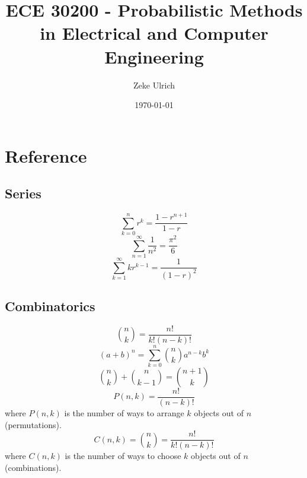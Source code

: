 \documentclass[nobib]{tufte-handout}
\title{ECE 30200 - Probabilistic Methods in Electrical and Computer Engineering}
\author{Zeke Ulrich}
\date{\today}  %
\begin{document}
\maketitle

\tableofcontents

\pagebreak








\appendix

\section{Reference}
\setcounter{equation}{0}


\subsection{Series}
\begin{equation}
    \sum_{k=0}^{n} r^k = \frac{1 - r^{n + 1}}{1 - r}
\end{equation}
\begin{equation}
    \sum_{n=1}^{\infty} \frac{1}{n^2} = \frac{\pi^2}{6}
\end{equation}
\begin{equation}
    \sum_{k=1}^{\infty}kr^{k - 1} = \frac{1}{(1 - r)^2}
\end{equation}

\subsection{Combinatorics}
\begin{equation}
    {n\choose k} = \frac{n!}{k!(n - k)!}
\end{equation}
\begin{equation}
    (a + b)^n = \sum_{k=0}^{n} {n\choose k} a^{n - k}b^k
\end{equation}
\begin{equation}
    {n\choose k} + {n\choose k-1} = {n + 1\choose k}
\end{equation}
\begin{equation}
    P(n, k) = \frac{n!}{(n-k)!}
\end{equation}
where $P(n, k)$ is the number of ways to arrange $k$ objects out of $n$ (permutations).
\begin{equation}
    C(n, k) = {n\choose k} = \frac{n!}{k!(n-k)!}
\end{equation}
where $C(n, k)$ is the number of ways to choose $k$ objects out of $n$ (combinations).
\end{document}
